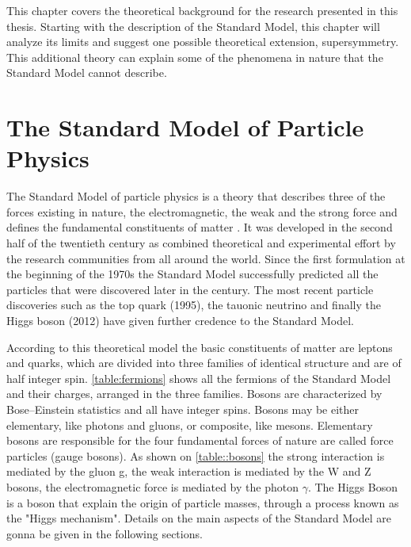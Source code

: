 
This chapter covers the theoretical background for the research presented in this thesis. Starting with the description of the Standard Model, this chapter will analyze its limits and suggest one possible theoretical extension, supersymmetry. This additional theory can explain some of the phenomena in nature that the Standard Model cannot describe.

\section{The Standard Model of Particle Physics}

The Standard Model of particle physics is a theory that describes three of the forces existing in nature, the electromagnetic, the weak and the strong force and defines the fundamental constituents of matter \cite{Spiesberger:2000ks}. It was developed in the second half of the twentieth century as combined theoretical and experimental effort by the research communities from all around the world. Since the first formulation at the beginning of the 1970s the Standard Model successfully predicted all the particles that were discovered later in the century. The most recent particle discoveries such as the top quark \cite{Campagnari:1996ai} (1995), the tauonic neutrino \cite{Agafonova:2015jxn} and finally the Higgs boson \cite{Aad:2012tfa,Chatrchyan:2012xdj}(2012) have given further credence to the Standard Model. 

According to this theoretical model the basic constituents of matter are leptons and quarks, which are divided into three families of identical structure and are of half integer spin. \autoref{table:fermions} shows all the fermions of the Standard Model and their charges, arranged in the three families. Bosons are characterized by Bose–Einstein statistics and all have integer spins. Bosons may be either elementary, like photons and gluons, or composite, like mesons. Elementary bosons are responsible for the four fundamental forces of nature are called force particles (gauge bosons). As shown on \autoref{table::bosons} the strong interaction is mediated by the gluon g, the weak interaction is mediated by the W and Z bosons, the electromagnetic force is mediated by the photon $\gamma$. The Higgs Boson is a boson that explain the origin of particle masses, through a process known as the "Higgs mechanism". Details on the main aspects of the Standard Model are gonna be given in the following sections.

